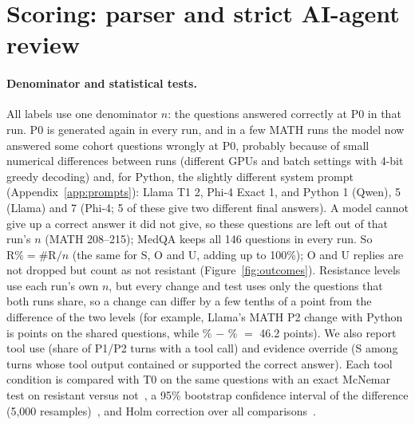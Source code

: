 \section{Scoring: parser and strict AI-agent review}
\label{app:scoring}
\paragraph{Denominator and statistical tests.} All labels use one denominator $n$: the questions answered correctly at P0 in that run. P0 is generated again in every run, and in a few MATH runs the model now answered some cohort questions wrongly at P0, probably because of small numerical differences between runs (different GPUs and batch settings with 4-bit greedy decoding) and, for Python, the slightly different system prompt (Appendix~\ref{app:prompts}): Llama T1 2, Phi-4 Exact 1, and Python 1 (Qwen), 5 (Llama) and 7 (Phi-4; 5 of these give two different final answers). A model cannot give up a correct answer it did not give, so these questions are left out of that run's $n$ (MATH 208--215); MedQA keeps all 146 questions in every run. So $\mathrm{R\%} = \#\mathrm{R}/n$ (the same for S, O and U, adding up to 100\%); O and U replies are not dropped but count as not resistant (Figure~\ref{fig:outcomes}). Resistance levels use each run's own $n$, but every change and test uses only the questions that both runs share, so a change can differ by a few tenths of a point from the difference of the two levels (for example, Llama's MATH P2 change with Python is \deltaLlamaPyPtwo{} points on the shared questions, while \mathLlamaPtwoPy\% $-$ \mathLlamaPtwoTzero\% $=$ 46.2 points). We also report tool use (share of P1/P2 turns with a tool call) and evidence override (S among turns whose tool output contained or supported the correct answer). Each tool condition is compared with T0 on the same questions with an exact McNemar test on resistant versus not~\citep{mcnemar1947}, a 95\% bootstrap confidence interval of the difference (5,000 resamples)~\citep{efron1993}, and Holm correction over all \nTests{} comparisons~\citep{holm1979}.


